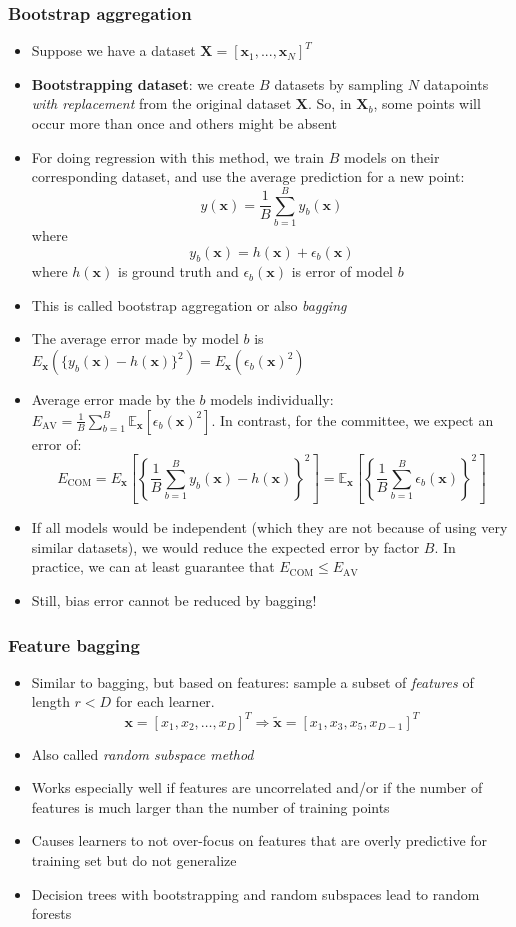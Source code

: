 \subsubsection{Bootstrap aggregation}
\begin{itemize}
	\item Suppose we have a dataset $\bm{X} = \left[\bm{x}_1, ..., \bm{x}_N\right]^T$
	\item \textbf{Bootstrapping dataset}: we create $B$ datasets by sampling $N$ datapoints \textit{with replacement} from the original dataset $\bm{X}$. So, in $\bm{X}_b$, some points will occur more than once and others might be absent
	\item For doing regression with this method, we train $B$ models on their corresponding dataset, and use the average prediction for a new point:
	$$y(\bm{x}) = \frac{1}{B}\sum\limits_{b=1}^{B} y_b(\bm{x})$$ where $$ y_b(\bm{x}) = h(\bm{x}) + \epsilon_b(\bm{x})$$ where $h(\bm{x})$ is ground truth and $\epsilon_b(\bm{x})$ is error of model $b$
	\item This is called bootstrap aggregation or also \textit{bagging}
	\item The average error made by model $b$ is $E_{\bm{x}}(\{ y_b(\bm{x}) - h(\bm{x}) \}^2) = E_{\bm{x}}(\epsilon_b(\bm{x})^2)$ 
	\item Average error made by the $b$ models individually: $E_{\text{AV}} = \frac{1}{B}\sum_{b=1}^{B} \mathbb{E}_{\bm{x}}\left[\epsilon_b(\bm{x})^2\right]$. In contrast, for the committee, we expect an error of:
	$$E_{\text{COM}} = E_{\bm{x}}\left[ \left\{ \dfrac{1}{B} \sum_{b=1}^{B} y_b(\bm{x}) - h(\bm{x}) \right\}^2 \right] = \mathbb{E}_{\bm{x}}\left[\left\{\frac{1}{B}\sum\limits_{b=1}^{B}\epsilon_b(\bm{x})\right\}^2\right]$$
	\item If all models would be independent (which they are not because of using very similar datasets), we would reduce the expected error by factor $B$. In practice, we can at least guarantee that $E_{\text{COM}}\leq E_{\text{AV}}$
	\item Still, bias error cannot be reduced by bagging!
\end{itemize}
\subsubsection{Feature bagging}
\begin{itemize}
	\item Similar to bagging, but based on features: sample a subset of \textit{features} of length $r<D$ for each learner. 
	$$\bm{x} = \left[x_1, x_2, \dots, x_D\right]^T\Rightarrow \bm{\tilde{x}} = \left[x_1, x_3, x_5, x_{D-1}\right]^T$$
	\item Also called \textit{random subspace method}
	\item Works especially well if features are uncorrelated and/or if the number of features is much larger than the number of training points
	\item Causes learners to not over-focus on features that are overly predictive for training set but do not generalize  
	\item Decision trees with bootstrapping and random subspaces lead to random forests
\end{itemize}
